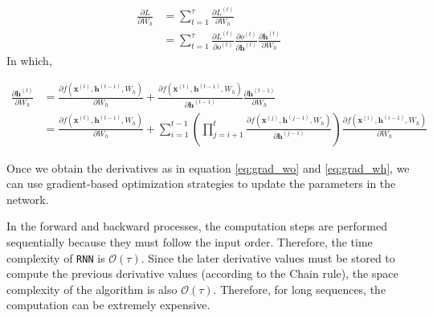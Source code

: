 \begin{align}
    \frac{\partial L}{\partial W_h} &= \sum_{t=1}^\tau{\frac{\partial L^{(t)}}{\partial W_h}}\\
    &= \sum_{t=1}^\tau{\frac{\partial L^{(t)}}{\partial o^{(t)}} \frac{\partial o^{(t)}}{\partial \mathbf{h}^{(t)}} \frac{\partial \mathbf{h}^{(t)}}{\partial W_h}}
\end{align} In which,

\begin{align}
    \frac{\partial \mathbf{h}^{(t)}}{\partial W_h} &= \frac{\partial f\left( \mathbf{x}^{(t)}, \mathbf{h}^{(t-1)}, W_h \right)}{\partial W_h} + \frac{\partial f\left( \mathbf{x}^{(t)}, \mathbf{h}^{(t-1)}, W_h \right)}{\partial \mathbf{h}^{(t-1)}} \frac{\partial \mathbf{h}^{(t-1)}}{\partial W_h}\\
    &= \frac{\partial f\left( \mathbf{x}^{(t)}, \mathbf{h}^{(t-1)}, W_h \right)}{\partial W_h} + \sum_{i=1}^{t-1}\left( \prod_{j=i+1}^t {\frac{\partial f\left( \mathbf{x}^{(j)}, \mathbf{h}^{(j-1)}, W_h \right)}{\partial \mathbf{h}^{(j-1)}}} \right) \frac{\partial f\left( \mathbf{x}^{(i)}, \mathbf{h}^{(i-1)}, W_h \right)}{\partial W_h}
    \label{eq:grad_wh}
\end{align}


Once we obtain the derivatives as in equation \ref{eq:grad_wo} and \ref{eq:grad_wh}, we can use gradient-based optimization strategies to update the parameters in the network.


In the forward and backward processes, the computation steps are performed sequentially because they must follow the input order. Therefore, the time complexity of \verb|RNN| is $\mathcal{O}(\tau)$. Since the later derivative values must be stored to compute the previous derivative values (according to the Chain rule), the space complexity of the algorithm is also $\mathcal{O}(\tau)$. Therefore, for long sequences, the computation can be extremely expensive.

